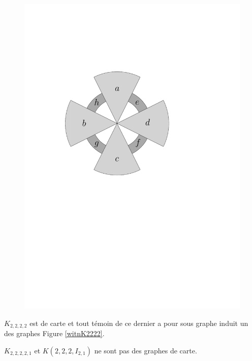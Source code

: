 \documentclass{scrartcl}
\begin{document}
\begin{flushleft}
\begin{figure}[h]
\begin{center}
        \includegraphics[page=\ipeFigsecondtemoinquatriparti, scale = 0.5]{figs}
    \end{center}
\end{figure}

\begin{lem}\label{formeK2222}
    $K_{2,2,2,2}$ est de carte et tout témoin de ce dernier a pour sous graphe induit un des graphes Figure \ref{witnK2222}.
\end{lem}

\begin{prop}\label{K22221}
    $K_{2,2,2,2,1}$ et $K(2,2,2,I_{2,1})$ ne sont pas des graphes de carte.
\end{prop}


\end{flushleft}
\end{document}
